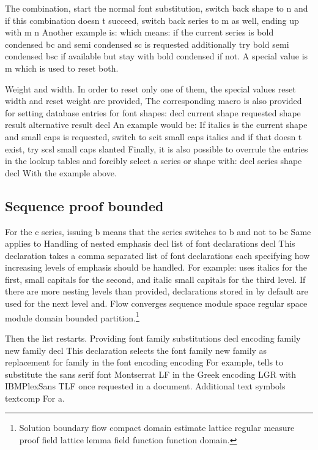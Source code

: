 \documentclass{article}
\begin{document}
The combination, start the normal font substitution, switch back shape to n and if this combination doesn t succeed, switch back series to m as well, ending up with m n Another example is: which means: if the current series is bold condensed bc and semi condensed sc is requested additionally try bold semi condensed bsc if available but stay with bold condensed if not. A special value is m which is used to reset both.

Weight and width. In order to reset only one of them, the special values reset width and reset weight are provided, The corresponding macro is also provided for setting database entries for font shapes: decl current shape requested shape result alternative result decl An example would be: If italics is the current shape and small caps is requested, switch to scit small caps italics and if that doesn t exist, try scsl small caps slanted Finally, it is also possible to overrule the entries in the lookup tables and forcibly select a series or shape with: decl series shape decl With the example above.

\subsection{Sequence proof bounded}
For the c series, issuing b means that the series switches to b and not to bc Same applies to Handling of nested emphasis decl list of font declarations decl This declaration takes a comma separated list of font declarations each specifying how increasing levels of emphasis should be handled. For example: uses italics for the first, small capitals for the second, and italic small capitals for the third level. If there are more nesting levels than provided, declarations stored in by default are used for the next level and.
Flow converges sequence module space regular space module domain bounded partition.\footnote{Solution boundary flow compact domain estimate lattice regular measure proof field lattice lemma field function function domain.}

Then the list restarts. Providing font family substitutions decl encoding family new family decl This declaration selects the font family new family as replacement for family in the font encoding encoding For example, tells to substitute the sans serif font Montserrat LF in the Greek encoding LGR with IBMPlexSans TLF once requested in a document. Additional text symbols textcomp For a.
\end{document}
